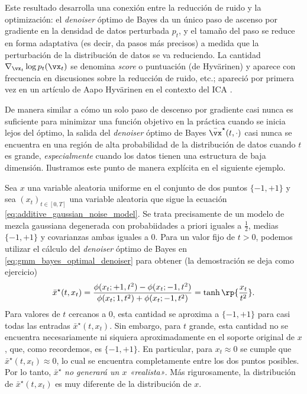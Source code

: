 \documentclass[../../book-main.tex]{subfiles}
\begin{document}
Este resultado desarrolla una conexión entre la reducción de ruido y la optimización:
el \textit{denoiser} óptimo de Bayes da un único paso de ascenso por gradiente en
la densidad de datos perturbada \(p_{t}\), y el tamaño del paso se reduce en forma adaptativa
(es decir, da pasos más precisos) a medida que la perturbación
de la distribución de datos se va reduciendo. La cantidad
\(\nabla_{\vx_{t}}\log p_{t}(\vx_{t})\) se denomina
\textit{score} o puntuación (de Hyv\"arinen) y aparece con frecuencia en discusiones
sobre la reducción de ruido, etc.; apareció por primera vez en un artículo de Aapo
Hyv\"arinen en el contexto del ICA \cite{hyvarinen05a}.

De manera similar a cómo un solo paso de descenso por gradiente casi nunca es suficiente para
minimizar una función objetivo en la práctica cuando se inicia lejos del óptimo, la
salida del \textit{denoiser} óptimo de Bayes \(\bar{\vx}^{\star}(t, \cdot)\)
casi nunca se encuentra en una región de alta probabilidad de la distribución de datos
cuando \(t\) es grande, \textit{especialmente} cuando los datos
tienen una estructura de baja dimensión. Ilustramos este punto de manera explícita
en el siguiente ejemplo.
\begin{example}\label{example:denoising_twopoints}
    Sea \(x\) una variable aleatoria uniforme en el conjunto de dos puntos \(\{-1, +1\}\) y sea
    \((x_{t})_{t \in [0, T]}\) una variable aleatoria que sigue
    la ecuación \eqref{eq:additive_gaussian_noise_model}. Se trata precisamente de un
    modelo de mezcla gaussiana degenerada con probabiidades a priori iguales a
    \(\frac{1}{2}\), medias \(\{-1, +1\}\) y covarianzas ambas iguales
    a \(0\). Para un valor fijo de \(t > 0\), podemos utilizar el cálculo del
    \textit{denoiser} óptimo de Bayes en \eqref{eq:gmm_bayes_optimal_denoiser}
    para obtener (la demostración se deja como ejercicio)
    \begin{equation}
        \bar{x}^{\star}(t, x_{t}) = \frac{\phi(x_{t} ; +1, t^{2}) - \phi(x_{t}
        ; -1, t^{2})}{\phi(x_{t} ; 1, t^{2}) + \phi(x_{t} ; -1,
        t^{2})} = \tanh\rp{\frac{x_{t}}{t^{2}}}.
    \end{equation}
    Para valores de \(t\) cercanos a \(0\), esta cantidad se aproxima a \(\{-1, +1\}\) para
    casi todas las entradas \(\bar{x}^{\star}(t, x_{t})\). Sin embargo, para
    \(t\) grande, esta cantidad no se encuentra necesariamente ni siquiera aproximadamente
    en el soporte original de \(x\), que, como recordemos, es \(\{-1,
    +1\}\). En particular, para \(x_{t} \approx 0\) se cumple que
    \(\bar{x}^{\star}(t, x_{t}) \approx 0\), lo cual se encuentra completamente
    entre los dos puntos posibles. Por lo tanto, \(\bar{x}^{\star}\)
    \textit{no generará un \(x\) «realista»}. Más rigurosamente,
    la distribución de \(\bar{x}^{\star}(t, x_{t})\) es muy
    diferente de la distribución de \(x\).
\end{example}
\end{document}
